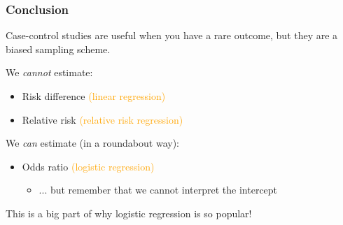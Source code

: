 \documentclass[12pt, 
hyperref={colorlinks=true, linkcolor=blue, urlcolor=cyan}]{beamer}
\begin{document}
\begin{frame}
\frametitle{Conclusion}

Case-control studies are useful when you have a rare outcome, but they are a biased sampling scheme.

We \textit{cannot} estimate:
\begin{itemize}
\item Risk difference \textcolor{orange}{(linear regression)}
\item Relative risk \textcolor{orange}{(relative risk regression)}
\end{itemize}

We \textit{can} estimate (in a roundabout way):
\begin{itemize}
\item Odds ratio \textcolor{orange}{(logistic regression)}
	\begin{itemize}
	\item[] ... but remember that we cannot interpret the intercept
	\end{itemize}
\end{itemize}

This is a big part of why logistic regression is so popular!


\end{frame}
\end{document}
